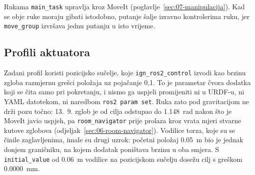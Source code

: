 Rukama \texttt{main\_task} upravlja kroz MoveIt (poglavlje~\ref{sec:07-manipulacija}). Kad se
obje ruke moraju gibati istodobno, putanje šalje izravno kontrolerima ruku, jer
\texttt{move\_group} izvršava jednu putanju u isto vrijeme.

\subsection{Profili aktuatora}
\label{sec:04-profili}

Zadani profil koristi pozicijsko sučelje, koje \texttt{ign\_ros2\_control} izvodi kao brzinu
zgloba razmjernu grešci položaja uz pojačanje 0,1. To je parametar čvora dodatka koji se čita
samo pri pokretanju, i nismo ga uspjeli promijeniti ni u URDF-u, ni YAML datotekom, ni naredbom
\texttt{ros2 param set}. Ruka zato pod gravitacijom ne drži pozu točno: 13.~9. zglob je od
cilja odstupao do \SI{1.148}{rad} nakon što je MoveIt javio uspjeh, pa \texttt{room\_navigator}
prije prolaza kroz vrata mjeri stvarne kutove zglobova (odjeljak~\ref{sec:06-room-navigator}).
Vodilice torza, koje su se činile zaglavljenima, imale su drugi uzrok: početni položaj
\SI{0.05}{m} bio je jednak donjem graničniku, na kojem dodatak poništava brzinu u oba smjera. S
\texttt{initial\_value} od \SI{0.06}{m} vodilice na pozicijskom sučelju dosežu cilj s greškom
\SI{0.0000}{mm}.

